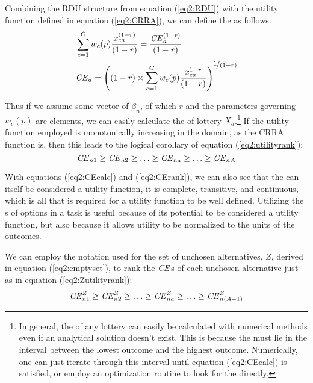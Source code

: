 \documentclass[../main.tex]{subfiles}
\begin{document}
Combining the RDU structure from equation (\ref{eq2:RDU}) with the utility function defined in equation (\ref{eq2:CRRA}), we can define the {\CE} as follows:
\begin{align}
	\label{eq2:CEcalc}
	\begin{split}
		&\sum_{c=1}^{C} w_c(p) \frac{x_{ca}^{(1-r)}}{(1-r)} = \frac{ {\mathit{CE}}_a^{(1-r)}}{(1-r)}\\
		&{\mathit{CE}}_a =  \left( (1-r) \times \sum_{c=1}^{C} w_c(p) \frac{x_{ca}^{1-r}}{(1-r)} \right)^{ \displaystyle\nicefrac{1}{(1-r)} }
	\end{split}
\end{align}

Thus if we assume some vector of $\beta_n$, of which $r$ and the parameters governing $w_c(p)$ are elements, we can easily calculate the {\CE} of lottery $X_a$.\footnote{ In general, the {\CE} of any lottery can easily be calculated with numerical methods even if an analytical solution doesn't exist.
This is because the {\CE} must lie in the interval between the lowest outcome and the highest outcome.
Numerically, one can just iterate through this interval until equation (\ref{eq2:CEcalc}) is satisfied, or employ an optimization routine to look for the {\CE} directly.}
If the utility function employed is monotonically increasing in the domain, as the CRRA function is, then this leads to the  logical corollary of equation (\ref{eq2:utilityrank}):
\begin{equation}
	\label{eq2:CErank}
	{\ensuremath{\mathit{CE}}}_{n1} \geq {\ensuremath{\mathit{CE}}}_{n2} \geq \ldots \geq {\ensuremath{\mathit{CE}}}_{na} \geq \ldots \geq {\ensuremath{\mathit{CE}}}_{nA}
\end{equation}

With equations (\ref{eq2:CEcalc}) and (\ref{eq2:CErank}), we can also see that the {\CE} can itself be considered a utility function, it is complete, transitive, and continuous, which is all that is required for a utility function to be well defined.
Utilizing the {\CE}s of options in a task is useful because of its potential to be considered a utility function, but also because it allows utility to be normalized to the units of the outcomes.

We can employ the notation used for the set of unchosen alternatives, $Z$, derived in equation (\ref{eq2:emptyset}), to rank the ${\mathit{CE}}$s of each unchosen alternative just as in equation (\ref{eq2:Zutilityrank}):
\begin{equation}
	\label{eq2:CEZ}
	{\ensuremath{\mathit{CE}}}_{n1}^Z \geq {\ensuremath{\mathit{CE}}}_{n2}^Z \geq \ldots \geq {\ensuremath{\mathit{CE}}}_{na}^Z \geq \ldots \geq {\ensuremath{\mathit{CE}}}_{n(A-1)}^Z
\end{equation}
\end{document}
